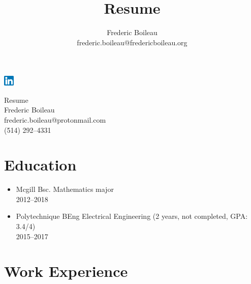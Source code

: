 \documentclass{article}
\title{Resume}
\author{Frederic Boileau\\[1em] frederic.boileau@fredericboileau.org}
\begin{document}
\pagestyle{empty} \null\hfill\href{https://www.linkedin.com/in/frederic-boileau/}{\includegraphics[width=5mm]{linkedin.png}}
\begin{center}
  Resume\\
  Frederic Boileau\\
  frederic.boileau@protonmail.com\\
  (514) 292--4331
\end{center}

\section*{Education}

\begin{itemize}
  \item Mcgill Bsc. Mathematics major \\
    2012--2018
  \item Polytechnique BEng Electrical Engineering (2 years, not completed, GPA: 3.4/4)\\ 2015--2017
\end{itemize}


\section*{Work Experience}
\end{document}
